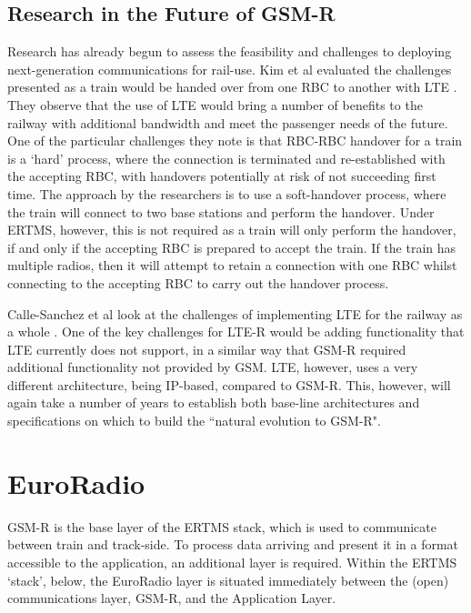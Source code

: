 \documentclass[twoside,11pt,a4paper]{article}
\begin{document}
\subsection{Research in the Future of GSM-R}
Research has already begun to assess the feasibility and challenges to deploying next-generation communications for rail-use. Kim et al evaluated the challenges presented as a train would be handed over from one RBC to another with LTE \citep{Kim14a}. They observe that the use of LTE would bring a number of benefits to the railway with additional bandwidth and meet the passenger needs of the future. One of the particular challenges they note is that RBC-RBC handover for a train is a `hard' process, where the connection is terminated and re-established with the accepting RBC, with handovers potentially at risk of not succeeding first time. The approach by the researchers is to use a soft-handover process, where the train will connect to two base stations and perform the handover. Under ERTMS, however, this is not required as a train will only perform the handover, if and only if the accepting RBC is prepared to accept the train. If the train has multiple radios, then it will attempt to retain a connection with one RBC whilst connecting to the accepting RBC to carry out the handover process.

Calle-Sanchez et al look at the challenges of implementing LTE for the railway as a whole \citep{CalleSanchez12a}. One of the key challenges for LTE-R would be adding functionality that LTE currently does not support, in a similar way that GSM-R required additional functionality not provided by GSM. LTE, however, uses a very different architecture, being IP-based, compared to GSM-R. This, however, will again take a number of years to establish both base-line architectures and specifications on which to build the ``natural evolution to GSM-R".

\clearpage

\section{EuroRadio}
GSM-R is the base layer of the ERTMS stack, which is used to communicate between train and track-side. To process data arriving and present it in a format accessible to the application, an additional layer is required. Within the ERTMS `stack', below, the EuroRadio layer is situated immediately between the (open) communications layer, GSM-R, and the Application Layer.
\end{document}
